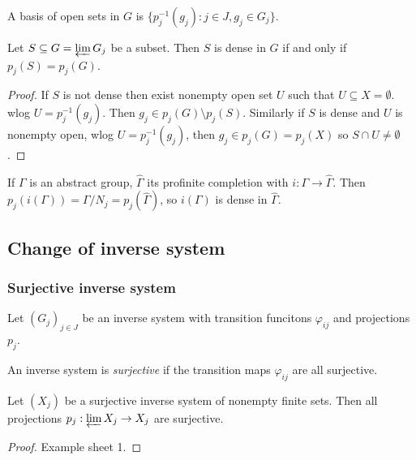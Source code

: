\documentclass[a4paper]{article}
\begin{document}
\begin{corollary}
  A basis of open sets in \(G\) is \(\{p_j^{-1}(g_j): j \in J, g_j \in G_j\}\).
\end{corollary}

\begin{corollary}
  Let \(S \subseteq G = \varprojlim G_j\) be a subset. Then \(S\) is dense in \(G\) if and only if \(p_j(S) = p_j(G)\).
\end{corollary}

\begin{proof}
  If \(S\) is not dense then exist nonempty open set \(U\) such that \(U \subseteq X = \emptyset\). wlog \(U = p_j^{-1}(g_j)\). Then \(g_j \in p_j(G) \setminus p_j(S)\). Similarly if \(S\) is dense and \(U\) is nonempty open, wlog \(U = p_j^{-1}(g_j)\), then \(g_j \in p_j(G) = p_j(X)\) so \(S \cap U \ne \emptyset\).
\end{proof}

\begin{eg}
  If \(\Gamma\) is an abstract group, \(\hat \Gamma\) its profinite completion with \(i: \Gamma \to \hat \Gamma\). Then \(p_j(i(\Gamma)) = \Gamma/N_j = p_j(\hat \Gamma)\), so \(i(\Gamma)\) is dense in \(\hat \Gamma\).
\end{eg}

\subsection{Change of inverse system}

\subsubsection{Surjective inverse system}

Let \((G_j)_{j \in J}\) be an inverse system with transition funcitons \(\varphi_{ij}\) and projections \(p_j\).

\begin{definition}
  An inverse system is \emph{surjective} if the transition maps \(\varphi_{ij}\) are all surjective.
\end{definition}

\begin{proposition}
  Let \((X_j)\) be a surjective inverse system of nonempty finite sets. Then all projections \(p_j: \varprojlim X_j \to X_j\) are surjective.
\end{proposition}

\begin{proof}
  Example sheet 1.
\end{proof}
\end{document}
